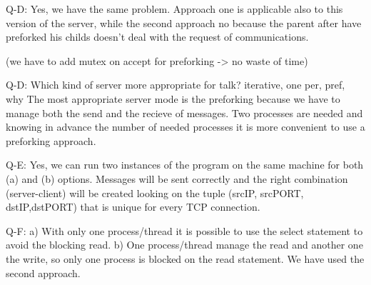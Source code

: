 Q-D: Yes, we have the same problem. Approach one is applicable also to this version of the server, while the second approach no because the parent after have preforked his childs doesn't deal with the request of communications. 

(we have to add mutex on accept for preforking -> no waste of time)

Q-D: Which kind of server more appropriate for talk? iterative, one per, pref, why
The most appropriate server mode is the preforking because we have to manage both the send and the recieve of messages. Two processes are needed and knowing in advance the number of needed processes it is more convenient to use a preforking approach.

Q-E: Yes, we can run two instances of the program on the same machine for both (a) and (b) options. Messages will be sent correctly and the right combination (server-client) will be created looking on the tuple (srcIP, srcPORT, dstIP,dstPORT) that is unique for every TCP connection.

Q-F: a) With only one process/thread it is possible to use the select statement to avoid the blocking read. 
b) One process/thread manage the read and another one the write, so only one process is blocked on the read statement.
We have used the second approach.


